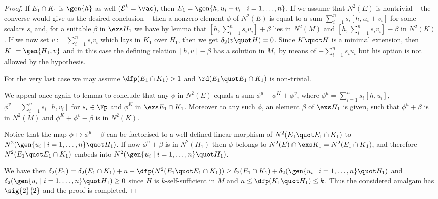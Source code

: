 \begin{proof}
If $E_{1}\cap K_{1}$ is $\gen{h}$ as well ($\mathcal{E}^{k}=\vac$), then
$E_{1}=\gen{h,u_{i}+v_{i}\mid i=1,\dots,n}$. If we assume that 
$N^{2}(E)$ is nontrivial -- the converse would give us the desired conclusion -- then a nonzero element
$\phi$ of $N^{2}(E)$ is equal to a sum $\sum_{i=1}^{n}s_{i}[h,u_{i}+v_{i}]$ for some scalars $s_{i}$ and, for a suitable
$\beta$ in $\exs H_{1}$ we have by lemma  that $[h,\sum_{i=1}^{n}s_{i}u_{i}]+\beta$ lies
in $N^{2}(M)$ and $[h,\sum_{i=1}^{n}s_{i}v_{i}]-\beta$ in $N^{2}(K)$. If we now set $v:=\sum_{i=1}^{n}s_{i}v_{i}$
which lays in $K_{1}$ over $H_{1}$, then we get $\delta_{2}(v\quot H)=0$. Since $K\quot H$ is a minimal
extension, then $K_{1}=\gen{H_{1}, v}$ and in this case the defining relation $[h,v]-\beta$ has a solution
in $M_{1}$ by means of $-\sum_{i=1}^{n}s_{i}u_{i}$ but his option is not allowed by the hypothesis.

\smallskip
For the very last case we may assume $\dfp(E_{1}\cap K_{1})>1$ and %
$\rd(E_{1}\quot E_{1}\cap K_{1})$
is non-trivial.

We appeal once again to lemma  to conclude that any $\phi$ in $N^{2}(E)$ equals
a sum $\phi^{u}+\phi^{K}+\phi^{v}$, where $\phi^{u}=\sum_{i=1}^{n} s_{i}[h,u_{i}]$, $\phi^{v}=\sum_{i=1}^{n}s_{i}[h,v_{i}]$
for $s_{i}\in\Fp$ and $\phi^{K}$ in $\exs E_{1}\cap K_{1}$. Moreover to any such $\phi$, an element $\beta$ of
$\exs H_{1}$ is given, such that $\phi^{u}+\beta$ is in $N^{2}(M)$ and $\phi^{K}+\phi^{v}-\beta$ is in $N^{2}(K)$.

Notice that the map $\phi\mapsto\phi^{u}+\beta$ can be factorised to a well defined linear morphism
of $N^{2}(E_{1}\quot E_{1}\cap K_{1})$ to $N^{2}(\gen{u_{i}\mid i=1,\dots,n}\quot H_{1})$. If
now $\phi^{u}+\beta$ is in $N^{2}(H_{1})$ then $\phi$ belongs to $N^{2}(E)\cap\exs K_{1}=N^{2}(E_{1}\cap K_{1})$,
and therefore $N^{2}(E_{1}\quot E_{1}\cap K_{1})$ embeds into $N^{2}(\gen{u_{i}\mid i=1,\dots,n}\quot H_{1})$.

We have then $\delta_{2}(E_{1})=\delta_{2}(E_{1}\cap K_{1})+n-\dfp(N^{2}(E_{1}\quot E_{1}\cap K_{1}))\geq
\delta_{2}(E_{1}\cap K_{1})+\delta_{2}(\gen{u_{i}\mid i=1,\dots,n}\quot H_{1})$ and 
$\delta_{2}(\gen{u_{i}\mid i=1,\dots,n}\quot H_{1})\geq0$ since $H$ is $k$-self-sufficient in $M$ and
$n\leq\dfp(K_{1}\quot H_{1})\leq k$. Thus the considered amalgam has $\sig{2}{2}$ and the
proof is completed.
\end{proof}


